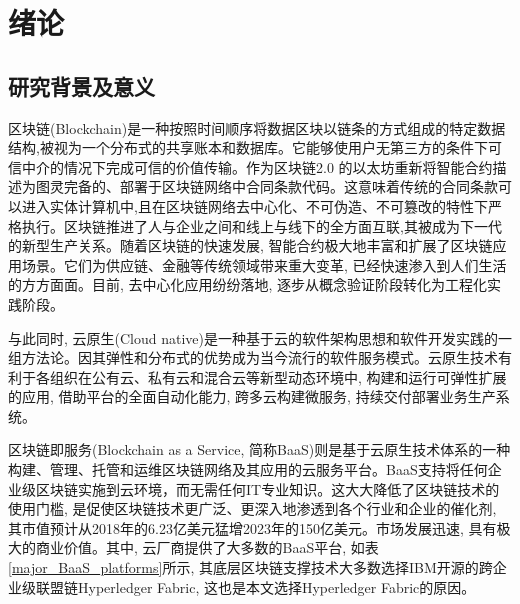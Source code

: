 \chapter{绪论}

\section{研究背景及意义}

区块链(Blockchain)是一种按照时间顺序将数据区块以链条的方式组成的特定数据结构,被视为一个分布式的共享账本和数据库。它能够使用户无第三方的条件下可信中介的情况下完成可信的价值传输\cite{SurveyofEnterpriseBlockchains}。作为区块链2.0 的以太坊\footnotemark[1]重新将智能合约描述为图灵完备的、部署于区块链网络中合同条款代码。这意味着传统的合同条款可以进入实体计算机中,且在区块链网络去中心化、不可伪造、不可篡改的特性下严格执行。区块链推进了人与企业之间和线上与线下的全方面互联,其被成为下一代的新型生产关系。随着区块链的快速发展, 智能合约极大地丰富和扩展了区块链应用场景。它们为供应链、金融等传统领域带来重大变革, 已经快速渗入到人们生活的方方面面。目前, 去中心化应用纷纷落地, 逐步从概念验证阶段转化为工程化实践阶段\footnotemark[2]。

与此同时, 云原生(Cloud native)是一种基于云的软件架构思想和软件开发实践的一组方法论。因其弹性和分布式的优势成为当今流行的软件服务模式。云原生技术有利于各组织在公有云、私有云和混合云等新型动态环境中, 构建和运行可弹性扩展的应用, 借助平台的全面自动化能力, 跨多云构建微服务, 持续交付部署业务生产系统。

区块链即服务(Blockchain as a Service, 简称BaaS)则是基于云原生技术体系的一种构建、管理、托管和运维区块链网络及其应用的云服务平台\cite{onik2019performance}。BaaS支持将任何企业级区块链实施到云环境，而无需任何IT专业知识。这大大降低了区块链技术的使用门槛, 是促使区块链技术更广泛、更深入地渗透到各个行业和企业的催化剂, 其市值预计从2018年的6.23亿美元猛增2023年的150亿美元\footnotemark[3]。市场发展迅速, 具有极大的商业价值。其中, 云厂商提供了大多数的BaaS平台\cite{KuernetesbasedFabricChaincodeManagementAndHihgAvailabilityTechnology}, 如表\ref{major_BaaS_platforms}所示, 其底层区块链支撑技术大多数选择IBM开源的跨企业级联盟链Hyperledger Fabric, 这也是本文选择Hyperledger Fabric的原因。

